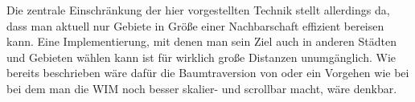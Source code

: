 Die zentrale Einschränkung der hier vorgestellten Technik stellt allerdings da, dass man aktuell nur Gebiete in Größe einer Nachbarschaft effizient bereisen kann. Eine Implementierung, mit denen man sein Ziel auch in anderen Städten und Gebieten wählen kann ist für wirklich große Distanzen unumgänglich. Wie bereits beschrieben wäre dafür die Baumtraversion von \cite{pierce_representations} oder ein Vorgehen wie bei \cite{wingrave2006overcoming} bei dem man die WIM noch besser skalier- und scrollbar macht, wäre denkbar.


